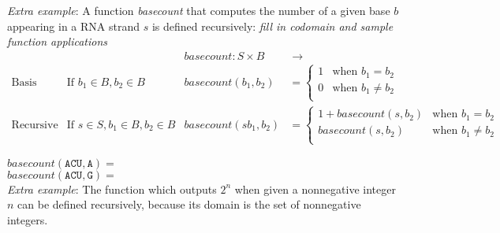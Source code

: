 \documentclass[12pt, oneside]{article}
\newcommand{\A}[0]{\texttt{A}}
\newcommand{\C}[0]{\texttt{C}}
\newcommand{\G}[0]{\texttt{G}}
\newcommand{\U}[0]{\texttt{U}}
\begin{document}
{\it Extra example}: A function \textit{basecount} that computes the number of a given base $b$ appearing in a RNA strand $s$ is defined recursively:  {\it fill in codomain and sample function
applications}
\[
\begin{array}{llll}
& & \textit{basecount} : S \times B & \to \phantom{\mathbb{N}} \\
\textrm{Basis Step:} &  \textrm{If } b_1 \in B, b_2 \in B & \textit{basecount}(b_1, b_2) & =
        \begin{cases}
            1 & \textrm{when } b_1 = b_2 \\
            0 & \textrm{when } b_1 \neq b_2 \\
        \end{cases} \\
\textrm{Recursive Step:} & \textrm{If } s \in S, b_1 \in B, b_2 \in B &\textit{basecount}(s b_1, b_2) & =
        \begin{cases}
            1 + \textit{basecount}(s, b_2) & \textrm{when } b_1 = b_2 \\
            \textit{basecount}(s, b_2) & \textrm{when } b_1 \neq b_2 \\
        \end{cases}
\end{array}
\]

$basecount(\A\C\U,\A) = \hspace{5in}$\\


$basecount(\A\C\U,\G) = \hspace{5in}$\\


\vfill
{\it Extra example}: The function which outputs $2^n$ when given a nonnegative integer $n$ can be defined recursively, 
because its domain is the set of nonnegative integers.

\vfill
 \newpage
\end{document}
